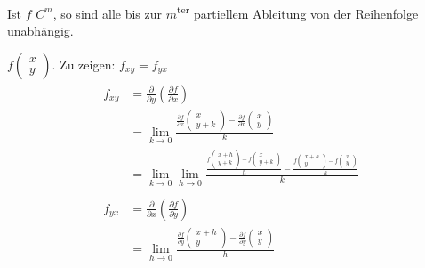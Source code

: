 \begin{satz*}
	Ist $f$ $C^m$, so sind alle bis zur $m$\textsuperscript{ter} partiellem Ableitung von der Reihenfolge unabhängig. \\
	\begin{bew}[head = Beweisidee]
		$f\begin{pmatrix} x \\ y \end{pmatrix}$. Zu zeigen: $f_{xy} = f_{yx}$
		\begin{gather*}
			\begin{split}
				f_{xy}	&= \frac{\partial}{\partial y} \left( \frac{\partial f}{\partial x} \right) \\
					&= \lim_{k \rightarrow 0} \frac{\frac{\partial f}{\partial x} \begin{pmatrix} x \\ y + k \end{pmatrix} - \frac{\partial f}{\partial x} \begin{pmatrix} x \\ y \end{pmatrix}}{k} \\
					&= \lim_{k \rightarrow 0} \lim_{h \rightarrow 0} \frac{\frac{f\begin{pmatrix} x+h \\ y+k \end{pmatrix} - f\begin{pmatrix} x \\ y +k \end{pmatrix}}{h} - \frac{f\begin{pmatrix} x+h \\ y\end{pmatrix} - f\begin{pmatrix} x \\ y \end{pmatrix}}{h}}{k}
				\end{split} \\
				\begin{split}
				f_{yx}	&= \frac{\partial}{\partial x} \left( \frac{\partial f}{\partial y} \right) \\
					&= \lim_{h \rightarrow 0} \frac{\frac{\partial f}{\partial y} \begin{pmatrix} x+h \\ y \end{pmatrix} - \frac{\partial f}{\partial y} \begin{pmatrix} x \\ y \end{pmatrix}}{h} \\

\end{split}
\end{gather*}
\end{bew}
\end{satz*}
